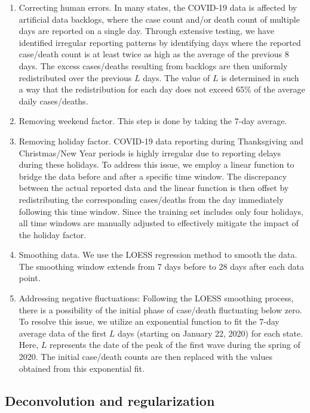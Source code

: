 \documentclass[sn-mathphys,Numbered]{sn-jnl}
\begin{document}
\begin{enumerate}
    \item Correcting human errors. In many states, the COVID-19 data is affected by artificial data backlogs, where the case count and/or death count of multiple days are reported on a single day. Through extensive testing, we have identified irregular reporting patterns by identifying days where the reported case/death count is at least twice as high as the average of the previous 8 days. The excess cases/deaths resulting from backlogs are then uniformly redistributed over the previous $L$ days. The value of $L$ is determined in such a way that the redistribution for each day does not exceed 65\% of the average daily cases/deaths.
    \item Removing weekend factor. This step is done by taking the $7$-day average.
    \item Removing holiday factor. COVID-19 data reporting during Thanksgiving and Christmas/New Year periods is highly irregular due to reporting delays during these holidays. To address this issue, we employ a linear function to bridge the data before and after a specific time window. The discrepancy between the actual reported data and the linear function is then offset by redistributing the corresponding cases/deaths from the day immediately following this time window. Since the training set includes only four holidays, all time windows are manually adjusted to effectively mitigate the impact of the holiday factor.
    \item Smoothing data. We use the LOESS regression method \cite{cleveland1988locally} to smooth the data. The smoothing window extends from 7 days before to 28 days after each data point.
    \item Addressing negative fluctuations: Following the LOESS smoothing process, there is a possibility of the initial phase of case/death fluctuating below zero. To resolve this issue, we utilize an exponential function to fit the $7$-day average data of the first $L$ days (starting on January 22, 2020) for each state. Here, $L$ represents the date of the peak of the first wave during the spring of 2020. The initial case/death counts are then replaced with the values obtained from this exponential fit.
        
\end{enumerate}


\subsection{Deconvolution and regularization}
\end{document}
